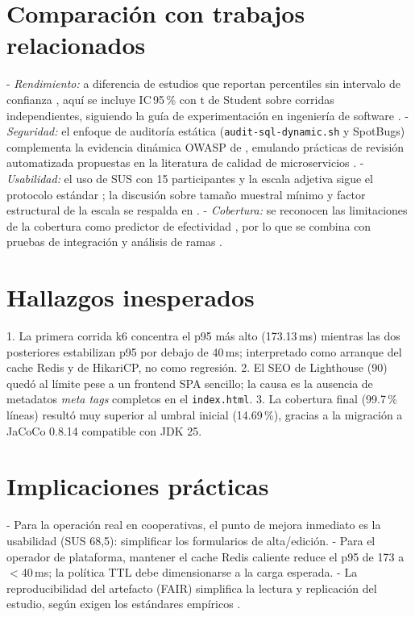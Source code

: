 \section{Comparación con trabajos relacionados}

- \emph{Rendimiento:} a diferencia de estudios que reportan percentiles sin
  intervalo de confianza \cite{jiang2009}, aquí se incluye IC\,95\,\% con t de
  Student sobre corridas independientes, siguiendo la guía de experimentación en
  ingeniería de software \cite{wohlin2012}.
- \emph{Seguridad:} el enfoque de auditoría estática (\texttt{audit-sql-dynamic.sh}
  y SpotBugs) complementa la evidencia dinámica OWASP de \cite{owasp2021},
  emulando prácticas de revisión automatizada propuestas en la literatura de
  calidad de microservicios \cite{taibi2018}.
- \emph{Usabilidad:} el uso de SUS con 15 participantes y la escala adjetiva sigue
  el protocolo estándar \cite{brooke1996,bangor2009}; la discusión sobre tamaño
  muestral mínimo y factor estructural de la escala se respalda en \cite{lewis2009}.
- \emph{Cobertura:} se reconocen las limitaciones de la cobertura como predictor
  de efectividad \cite{inozemtseva2014}, por lo que se combina con pruebas de
  integración y análisis de ramas \cite{gopinath2014,gligoric2013,ivankovic2019}.

\section{Hallazgos inesperados}

1. La primera corrida k6 concentra el p95 más alto (173.13\,ms) mientras las dos
   posteriores estabilizan p95 por debajo de 40\,ms; interpretado como arranque del
   cache Redis y de HikariCP, no como regresión.
2. El SEO de Lighthouse (90) quedó al límite pese a un frontend SPA sencillo; la
   causa es la ausencia de metadatos \emph{meta tags} completos en el \texttt{index.html}.
3. La cobertura final (99.7\,\% líneas) resultó muy superior al umbral inicial
   (14.69\,\%), gracias a la migración a JaCoCo 0.8.14 compatible con JDK 25.

\section{Implicaciones prácticas}

- Para la operación real en cooperativas, el punto de mejora inmediato es la
  usabilidad (SUS 68,5): simplificar los formularios de alta/edición.
- Para el operador de plataforma, mantener el cache Redis caliente reduce el p95
  de 173 a $<$40\,ms; la política TTL debe dimensionarse a la carga esperada.
- La reproducibilidad del artefacto (FAIR) simplifica la lectura y replicación del
  estudio, según exigen los estándares empíricos \cite{ralph2021,prisma2021}.